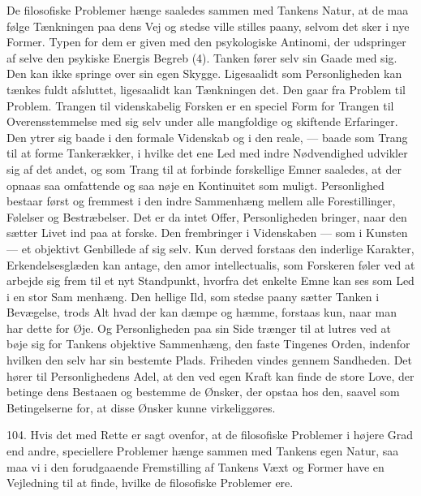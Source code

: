\documentclass[12pt,a4paper]{book}
\newcommand{\opage}[1]{\marginnote{\footnotesize\textit{[#1]}}}
\begin{document}
De filosofiske Problemer hænge saaledes sammen med Tankens Natur, at de maa følge
Tænkningen paa dens Vej og stedse ville stilles paany, selvom det sker i nye
Former. Typen for dem er given med den psykologiske Antinomi, der udspringer af
selve den psykiske Energis Begreb (4). Tanken fører selv sin Gaade med sig. Den
kan ikke springe over sin egen Skygge. Ligesaalidt som Personligheden kan tænkes
fuldt afsluttet, ligesaalidt kan Tænkningen det. Den gaar fra Problem til Problem.
Trangen til videnskabelig Forsken er en speciel Form for Trangen til
Overensstemmelse med sig selv under alle mangfoldige og skiftende Erfaringer. Den
ytrer sig baade i den formale Videnskab og i den reale, --- baade som Trang til at
forme Tankerækker, i hvilke det ene Led med indre Nødvendighed udvikler sig af det
andet, og som Trang til at forbinde forskellige Emner saaledes, at der opnaas saa
omfattende og saa nøje en Kontinuitet som muligt. Personlighed bestaar først og
fremmest i den indre Sammenhæng mellem alle Forestillinger, Følelser og
Bestræbelser. Det er da intet Offer, Personligheden bringer, naar den sætter Livet
ind paa at forske. Den frembringer i Videnskaben --- som i Kunsten --- et objektivt
Genbillede af sig selv. Kun derved forstaas den inderlige Karakter,
Erkendelsesglæden kan antage, den amor intellectualis, som Forskeren føler ved at
arbejde sig frem til et nyt Standpunkt, hvorfra det enkelte Emne kan ses som Led i
en stor Sam%
\opage{248}menhæng. Den hellige Ild, som stedse paany sætter Tanken i Bevægelse,
trods Alt hvad der kan dæmpe og hæmme, forstaas kun, naar man har dette for Øje. Og
Personligheden paa sin Side trænger til at lutres ved at bøje sig for Tankens
objektive Sammenhæng, den faste Tingenes Orden, indenfor hvilken den selv har sin
bestemte Plads. Friheden vindes gennem Sandheden. Det hører til Personlighedens
Adel, at den ved egen Kraft kan finde de store Love, der betinge dens Bestaaen og
bestemme de Ønsker, der opstaa hos den, saavel som Betingelserne for, at disse
Ønsker kunne virkeliggøres.

104. Hvis det med Rette er sagt ovenfor, at de filosofiske Problemer i højere Grad
end andre, speciellere Problemer hænge sammen med Tankens egen Natur, saa maa vi i
den forudgaaende Fremstilling af Tankens Væxt og Former have en Vejledning til at
finde, hvilke de filosofiske Problemer ere.
\end{document}

